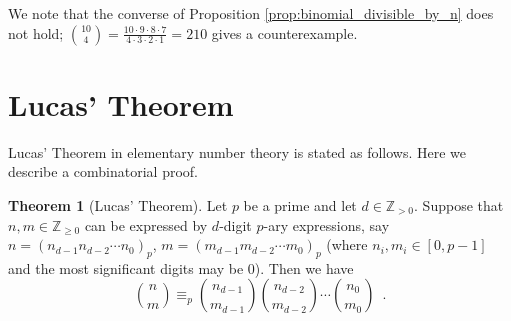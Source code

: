 ﻿\documentclass{article}
\theoremstyle{definition}
\newtheorem{theorem}{Theorem}
\begin{document}
We note that the converse of Proposition \ref{prop:binomial_divisible_by_n} does not hold; $\binom{10}{4} = \frac{ 10 \cdot 9 \cdot 8 \cdot 7 }{ 4 \cdot 3 \cdot 2 \cdot 1 } = 210$ gives a counterexample.


\section{Lucas' Theorem}

Lucas' Theorem \cite{Lucas78} in elementary number theory is stated as follows.
Here we describe a combinatorial proof.

\begin{theorem}
    [Lucas' Theorem]
    \label{thm:Lucas'_Theorem}
    Let $p$ be a prime and let $d \in \mathbb{Z}_{>0}$.
    Suppose that $n,m \in \mathbb{Z}_{\geq 0}$ can be expressed by $d$-digit $p$-ary expressions, say $n = (n_{d-1} n_{d-2} \cdots n_0)_p$, $m = (m_{d-1} m_{d-2} \cdots m_0)_p$ (where $n_i, m_i \in [0,p-1]$ and the most significant digits may be $0$).
    Then we have
    \[
        \binom{n}{m} \equiv_p \binom{n_{d-1}}{m_{d-1}} \binom{n_{d-2}}{m_{d-2}} \cdots \binom{n_0}{m_0} \enspace.
    \]
\end{theorem}
\end{document}
